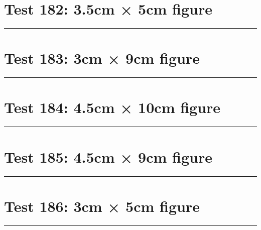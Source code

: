 \documentclass[a4paper,11pt]{article}
\begin{document}
\section*{Test 182: 3.5cm × 5cm figure}
\begin{swarmwrap}%
  \begin{minipage}[t]{3cm}
    \centering
    \rule{\linewidth}{5cm}
  \end{minipage}%
\end{swarmwrap}%
\swarmwrapnext
\lipsum[150]
\lipsum[1]
\lipsum[2]
\lipsum[3]
\lipsum[4]
\section*{Test 183: 3cm × 9cm figure}
\begin{swarmwrap}%
  \begin{minipage}[t]{3cm}
    \centering
    \rule{\linewidth}{9cm}
  \end{minipage}%
\end{swarmwrap}%
\swarmwrapnext
\lipsum[110]
\lipsum[111]
\lipsum[112]
\lipsum[113]
\lipsum[114]
\section*{Test 184: 4.5cm × 10cm figure}
\begin{swarmwrap}%
  \begin{minipage}[t]{4cm}
    \centering
    \rule{\linewidth}{10cm}
  \end{minipage}%
\end{swarmwrap}%
\swarmwrapnext
\lipsum[92]
\lipsum[93]
\lipsum[94]
\lipsum[95]
\lipsum[96]
\section*{Test 185: 4.5cm × 9cm figure}
\begin{swarmwrap}%
  \begin{minipage}[t]{4cm}
    \centering
    \rule{\linewidth}{9cm}
  \end{minipage}%
\end{swarmwrap}%
\swarmwrapnext
\lipsum[80]
\lipsum[81]
\lipsum[82]
\lipsum[83]
\lipsum[84]
\section*{Test 186: 3cm × 5cm figure}
\begin{swarmwrap}%
  \begin{minipage}[t]{3cm}
    \centering
    \rule{\linewidth}{5cm}
  \end{minipage}%
\end{swarmwrap}%
\swarmwrapnext
\lipsum[51]
\lipsum[52]
\lipsum[53]
\end{document}
